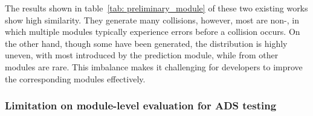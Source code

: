 The results shown in table~\ref{tab: preliminary_module} of these two existing works show high similarity. They generate many collisions, however, most are non-\mccs, in which multiple modules typically experience errors before a collision occurs. On the other hand, though some \mccs have been generated, the distribution is highly uneven, with most \mccs introduced by the prediction module, while \mccs from other modules are rare. This imbalance makes it challenging for developers to improve the corresponding modules effectively.


\subsubsection{Limitation on module-level evaluation for ADS testing}
\begin{table}[!t]
    \centering
    \caption{The ratio of module errors that can cause system failures}
    \vspace{-10pt}
    \vspace{-10pt}
    \label{tab:preliminary_fail}
\end{table}

